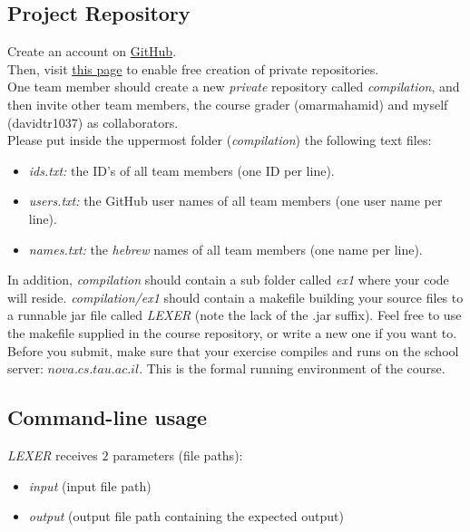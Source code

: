 \documentclass{article}
\begin{document}
\subsection{Project Repository}
Create an account on \href{https://github.com/}{GitHub}. \\
Then, visit \href{https://education.github.com/pack}{this page} to enable free creation of private repositories. \\
One team member should create a new \textit{private} repository called \textit{compilation},
and then invite other team members, the course grader (omarmahamid) and myself (davidtr1037) as collaborators. \\
Please put inside the uppermost folder (\textit{compilation}) the following text files:
\begin{itemize}
    \item \textit{ids.txt:} the ID's of all team members (one ID per line).
    \item \textit{users.txt:} the GitHub user names of all team members (one user name per line).
    \item \textit{names.txt:} the \textit{hebrew} names of all team members (one name per line).
\end{itemize}

In addition, \textit{compilation} should contain a sub folder called \textit{ex1} where your code will reside.
\textit{compilation/ex1} should contain a makefile building your source files to a
runnable jar file called \textit{LEXER} (note the lack of the .jar suffix).
Feel free to use the makefile supplied in the course repository,
or write a new one if you want to. 
Before you submit, make sure that your exercise compiles and runs
on the school server: $nova.cs.tau.ac.il$.
This is the formal running environment of the course.

\subsection{Command-line usage}
\textit{LEXER} receives $2$ parameters (file paths):
\begin{itemize}
    \item \textit{input} (input file path)
    \item \textit{output} (output file path containing the expected output)
\end{itemize}
\end{document}
